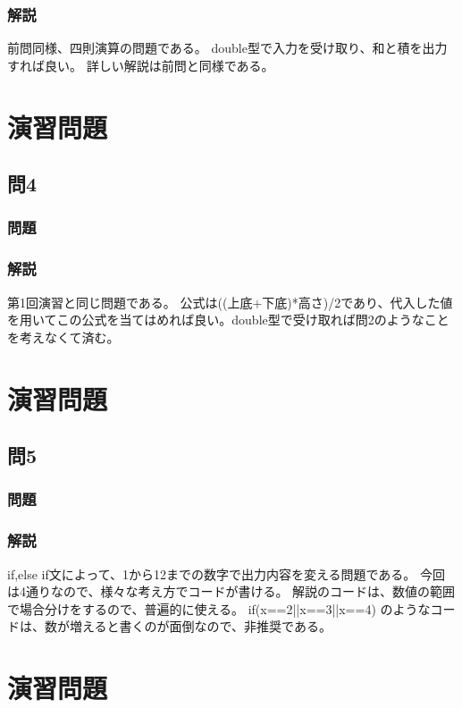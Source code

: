 \subsubsection{解説}

前問同様、四則演算の問題である。
double型で入力を受け取り、和と積を出力すれば良い。
詳しい解説は前問と同様である。

\section{演習問題}
\subsection{問4}
\subsubsection{問題}

\subsubsection{解説}

第1回演習と同じ問題である。
公式は((上底+下底)*高さ)/2であり、代入した値を用いてこの公式を当てはめれば良い。double型で受け取れば問2のようなことを考えなくて済む。


\section{演習問題}
\subsection{問5}
\subsubsection{問題}

\subsubsection{解説}

if,else if文によって、1から12までの数字で出力内容を変える問題である。
今回は4通りなので、様々な考え方でコードが書ける。
解説のコードは、数値の範囲で場合分けをするので、普遍的に使える。
if(x==2||x==3||x==4)
のようなコードは、数が増えると書くのが面倒なので、非推奨である。

\section{演習問題}
